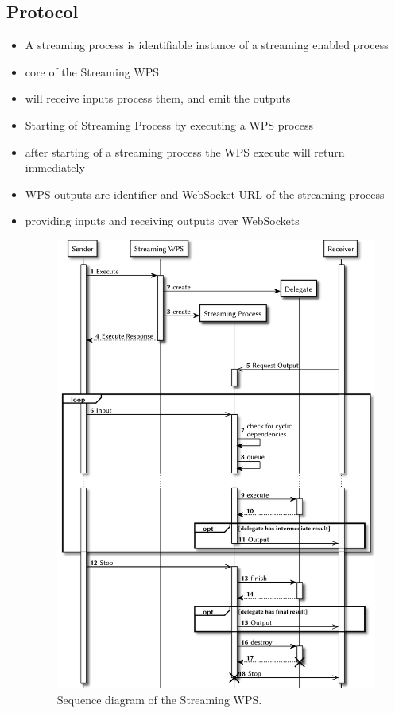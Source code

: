	\subsection{Protocol}
		\begin{itemize}
			\item A streaming process is identifiable instance of a streaming enabled process
			\item core of the Streaming WPS
			\item will receive inputs process them, and emit the outputs
			\item Starting of Streaming Process by executing a WPS process
			\item after starting of a streaming process the WPS execute will return immediately
			\item WPS outputs are identifier and WebSocket URL of the streaming process
			\item providing inputs and receiving outputs over WebSockets
			\begin{figure}[!htb]
				\centering
				\includegraphics[width=.7868\textwidth]{figures/sequence-diagramm-swps.pdf} %
				\caption{\label{fig:sd:swps} Sequence diagram of the Streaming WPS.}
			\end{figure}

\end{itemize}
